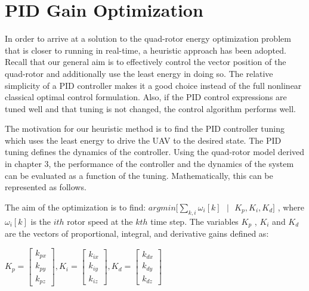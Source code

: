 
\chapter{PID Gain Optimization} %

\label{Chapter7} %



In order to arrive at a solution to the quad-rotor energy optimization problem that is closer to running in real-time, a heuristic approach has been adopted. Recall that our general aim is to effectively control the vector position of the quad-rotor and additionally use the least energy in doing so. The relative simplicity of a PID controller makes it a good choice instead of the full nonlinear classical optimal control formulation. Also, if the PID control expressions are tuned well and that tuning is not changed, the control algorithm performs well. 

The motivation for our heuristic method is to find the PID controller tuning which uses the least energy to drive the UAV to the desired state. The PID tuning defines the dynamics of the controller. Using the quad-rotor model derived in chapter 3, the performance of the controller and the dynamics of the system can be evaluated as a function of the tuning. Mathematically, this can be represented as follows. 

The aim of the optimization is to find: $ argmin \big[  \sum_{k,i} \omega_i[k] \text{ } | \text{ } K_p , K_i , K_d  \big]  $ , where $\omega_i[k]$ is the $ith$ rotor speed at the $kth$ time step. The variables $K_p$ , $K_i$ and $K_d$ are the vectors of proportional, integral, and derivative gains defined as:

\begin{center}
$ K_p = \left[ \begin{array}{c} k_{px} \\ k_{py} \\ k_{pz}  \end{array} \right] , K_i = \left[ \begin{array}{c} k_{ix} \\ k_{iy} \\ k_{iz}  \end{array} \right], K_d = \left[ \begin{array}{c} k_{dx} \\ k_{dy} \\ k_{dz}  \end{array} \right] $  
\end{center}

